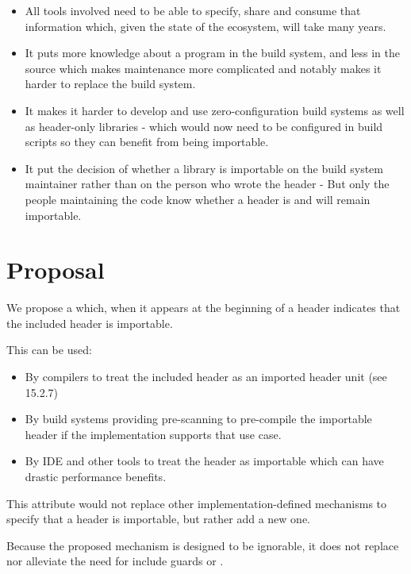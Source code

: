 \documentclass{wg21}
\begin{document}
\begin{itemize}
\item All tools involved need to be able to specify, share and consume that information which, given the state of the ecosystem, will take many years.
\item It puts more knowledge about a program in the build system, and less in the source which makes maintenance more complicated and notably makes it harder to replace the build system.
\item It makes it harder to develop and use zero-configuration build systems as well as header-only libraries - which would now need
to be configured in build scripts so they can benefit from being importable.
\item It put the decision of whether a library is importable on the build system maintainer rather than on the person who wrote the header - But only the people maintaining the code know whether a header is and will remain importable.
\end{itemize}

\section{Proposal}

We propose a  which, when it appears at the beginning of a header indicates that the included header is importable.

This can be used: 

\begin{itemize}
\item By compilers to treat the included header as an imported header unit (see 15.2.7)
\item By build systems providing pre-scanning to pre-compile the importable header if the implementation supports that use case.
\item By IDE and other tools to treat the header as importable which can have drastic performance benefits.
\end{itemize}

This attribute would not replace other implementation-defined mechanisms to specify that a header is importable,
but rather add a new one.

\begin{note}
Because the proposed mechanism is designed to be ignorable, it does not replace nor alleviate the need for include guards or . 
\end{note}
\end{document}
